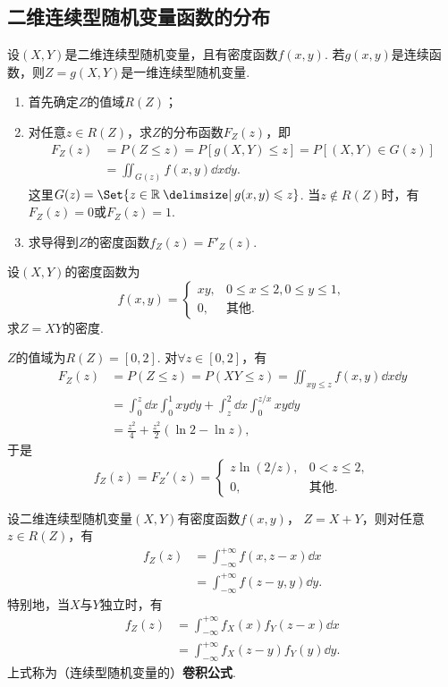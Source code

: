 \subsection{二维连续型随机变量函数的分布}
设\((X,Y)\)是二维连续型随机变量，且有密度函数\(f(x,y)\).
若\(g(x,y)\)是连续函数，则\(Z = g(X,Y)\)是一维连续型随机变量.
\begin{enumerate}
\item 首先确定\(Z\)的值域\(R(Z)\)；
\item 对任意\(z \in R(Z)\)，求\(Z\)的分布函数\(F_Z(z)\)，即\begin{align*}
F_Z(z) &= P(Z \leqslant z)
= P[g(X,Y) \leqslant z]
= P[(X,Y) \in G(z)] \\
&= \iint_{G(z)} f(x,y) \dd{x}\dd{y}.
\end{align*}
这里\(G(z) = \Set{ z\in\mathbb{R} \given g(x,y) \leqslant z }\).
当\(z \notin R(Z)\)时，有\(F_Z(z)=0\)或\(F_Z(z)=1\).
\item 求导得到\(Z\)的密度函数\(f_Z(z) = F'_Z(z)\).
\end{enumerate}

\begin{example}
设\((X,Y)\)的密度函数为\[
f(x,y) = \left\{ \begin{array}{cl}
xy, & 0 \leqslant x \leqslant 2, 0 \leqslant y \leqslant 1, \\
0, & \text{其他}.
\end{array} \right.
\]求\(Z = XY\)的密度.
\begin{solution}
\(Z\)的值域为\(R(Z)=[0,2]\).
对\(\forall z\in[0,2]\)，有\[\begin{aligned}
F_Z(z) &= P(Z \leqslant z)
= P(XY \leqslant z)
= \iint_{xy \leqslant z} f(x,y) \dd{x}\dd{y} \\
&= \int_0^z \dd{x} \int_0^1 xy \dd{y}
	+ \int_z^2 \dd{x} \int_0^{z/x} xy \dd{y} \\
&= \frac{z^2}{4} + \frac{z^2}{2} (\ln2 - \ln z),
\end{aligned}\]
于是\[
f_Z(z) = F_Z'(z)
= \left\{ \begin{array}{cl}
z \ln(2/z), & 0<z\leqslant2, \\
0, & \text{其他}.
\end{array} \right.
\]
\end{solution}
\end{example}

\begin{theorem}[卷积公式]\label{theorem:多维随机变量及其分布.连续型随机变量的卷积公式}
设二维连续型随机变量\((X,Y)\)有密度函数\(f(x,y)\)，%
\(Z=X+Y\)，则对任意\(z \in R(Z)\)，有\begin{align}
f_Z(z) &= \int_{-\infty}^{+\infty} f(x,z-x) \dd{x} \\
&= \int_{-\infty}^{+\infty} f(z-y,y) \dd{y}.
\end{align}
特别地，当\(X\)与\(Y\)独立时，有\begin{align}
f_Z(z) &= \int_{-\infty}^{+\infty} f_X(x) f_Y(z-x) \dd{x} \\
&= \int_{-\infty}^{+\infty} f_X(z-y) f_Y(y) \dd{y}.
\end{align}
上式称为（连续型随机变量的）\textbf{卷积公式}.
\end{theorem}

